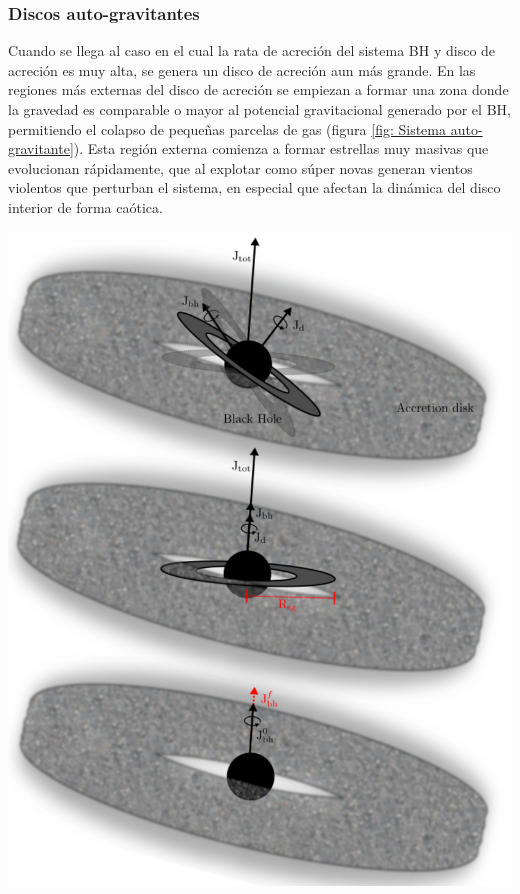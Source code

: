     \subsubsection{Discos auto-gravitantes}
    \label{subsubsec: Disco auto-gravitantes}
Cuando se llega al caso en el cual la rata de acreción del sistema BH y disco de acreción es muy alta, se genera un disco de acreción aun más grande. En las regiones más externas del disco de acreción se empiezan a formar una zona donde la gravedad  es comparable o mayor al potencial gravitacional generado por el BH, permitiendo el colapso de pequeñas parcelas de gas
(figura \ref{fig: Sistema auto-gravitante}). Esta región externa comienza a formar estrellas muy masivas que evolucionan rápidamente, que al explotar como súper novas generan vientos  violentos que perturban el sistema, en especial que afectan la dinámica del disco interior de forma caótica. 
%
\begin{center}
\includegraphics[scale=.3]{./figures/4_Modelo_Spin/Sistema_auto-gravitante.png}
\label{fig: Sistema auto-gravitante}
\end{center}
